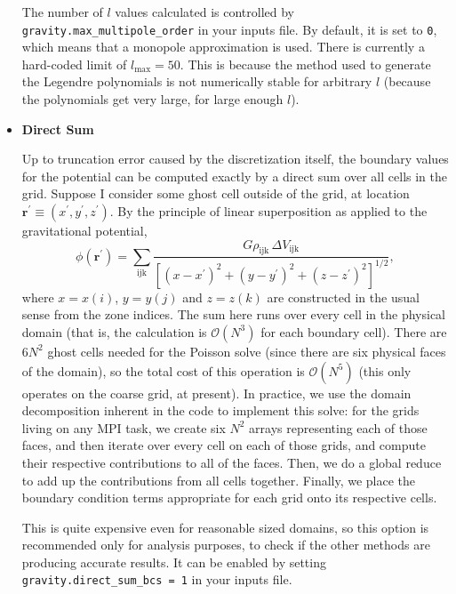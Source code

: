 \begin{itemize}
The number of $l$ values calculated is controlled by \texttt{gravity.max\_multipole\_order} in your inputs file. By default, it is set to \texttt{0}, which means that a monopole approximation is used. There is currently a hard-coded limit of $l_{\text{max}} = 50$. This is because the method used to generate the Legendre polynomials is not numerically stable for arbitrary $l$ (because the polynomials get very large, for large enough $l$).

\item \textbf{Direct Sum}

Up to truncation error caused by the discretization itself, the boundary values for the potential can be computed exactly by a direct sum over all cells in the grid. Suppose I consider some ghost cell outside of the grid, at location $\mathbf{r}^\prime \equiv (x^\prime, y^\prime, z^\prime)$. By the principle of linear superposition as applied to the gravitational potential,
\begin{equation}
  \phi(\mathbf{r}^\prime) = \sum_{\text{ijk}} \frac{G \rho_{\text{ijk}}\, \Delta V_{\text{ijk}}}{\left[(x - x^\prime)^2 + (y - y^\prime)^2 + (z - z^\prime)^2\right]^{1/2}},
\end{equation}
where $x = x(i)$, $y = y(j)$ and $z = z(k)$ are constructed in the usual sense from the zone indices. The sum here runs over every cell in the physical domain (that is, the calculation is $\mathcal{O}(N^3)$ for each boundary cell). There are $6N^2$ ghost cells needed for the Poisson solve (since there are six physical faces of the domain), so the total cost of this operation is $\mathcal{O}(N^5)$ (this only operates on the coarse grid, at present). In practice, we use the domain decomposition inherent in the code to implement this solve: for the grids living on any MPI task, we create six $N^2$ arrays representing each of those faces, and then iterate over every cell on each of those grids, and compute their respective contributions to all of the faces. Then, we do a global reduce to add up the contributions from all cells together. Finally, we place the boundary condition terms appropriate for each grid onto its respective cells.

This is quite expensive even for reasonable sized domains, so this option is recommended only for analysis purposes, to check if the other methods are producing accurate results. It can be enabled by setting \texttt{gravity.direct\_sum\_bcs = 1} in your inputs file.

\end{itemize}

